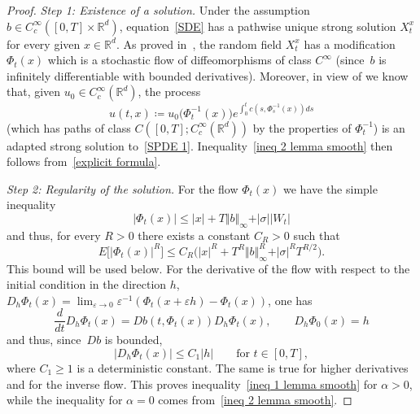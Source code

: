 \documentclass[a4paper,10pt]{article}
\newcommand\1{\mathbbm{1}}
\newcommand{\eps}{\varepsilon}
\numberwithin{equation}{section}
\begin{document}
\begin{proof}
\emph{Step 1: Existence of a solution.} Under the assumption $b\in C_{c}^{\infty}([0,T] \times\mathbb{R}^{d})$, equation~\eqref{SDE} has a pathwise unique strong solution $X_{t}^{x}$ for every given $x\in\mathbb{R}^{d}$. As proved in~\cite{KUNITA84}, the random field $X_{t}^{x}$ has
a modification $\Phi_{t}(x)$ which is a stochastic flow of diffeomorphisms of class $C^{\infty}$ (since~$b$ is infinitely differentiable with bounded derivatives). Moreover, in view of \cite[Theorem~6.1.9]{KUNITA90} we know that, given $u_{0}\in C_{c}^{\infty}(\mathbb{R}^{d})$, the process
\begin{equation}
u(t,x)  \coloneqq u_{0}\big(\Phi_{t}^{-1}(x) \big) e^{\int_{0}^{t}c(s,\Phi_{s}^{-1}(x))
ds}\label{explicit formula}
\end{equation}
(which has paths of class $C([0,T];C^{\infty}_c(\mathbb{R}^{d}))$ by the properties of $\Phi_{t}^{-1}$) is an adapted strong solution to~\eqref{SPDE 1}. Inequality~\eqref{ineq 2 lemma smooth} then follows from~\eqref{explicit formula}.

\emph{Step 2: Regularity of the solution.} For the flow $\Phi_{t}(x)$ we have the simple inequality 
\begin{equation*}
\vert \Phi_{t}(x) \vert \leq \vert x \vert +T \Vert b \Vert_{\infty}+ \vert \sigma \vert \vert
W_{t} \vert
\end{equation*}
and thus, for every $R>0$ there exists a constant $C_{R}>0$ such that
\begin{equation}
E\big[ \vert \Phi_{t}(x) \vert^{R} \big] \leq
C_{R} \big( \vert x \vert^{R}+ T^{R} \Vert b\Vert_{\infty}^{R}+ \vert \sigma \vert^{R} T^{R/2}\big) .
\label{bound on the flow}
\end{equation}
This bound will be used below. For the derivative of the flow with respect to the initial condition in the direction $h$, $D_{h}\Phi_{t}(x) =\lim_{\eps\rightarrow0} \eps^{-1} ( \Phi_{t}(x+\eps h)-\Phi_{t}(x) )$, one has
\begin{equation*}
\frac{d}{dt}D_{h}\Phi_{t}(x)  =Db(t,\Phi_{t}(x))  D_{h}\Phi_{t}(x)  , \qquad D_{h}\Phi_{0}(x)  =h
\end{equation*}
and thus, since~$Db$ is bounded,
\begin{equation}
\vert D_{h}\Phi_{t}(x) \vert \leq C_{1} \vert h \vert \qquad \text{for } t\in [0,T],  \label{ineq smooth uniform} 
\end{equation}
where $C_1 \geq 1$ is a deterministic constant. The same is true for higher derivatives and for the inverse flow. This proves inequality~\eqref{ineq 1 lemma smooth} for $\alpha>0$, while the inequality for $\alpha=0$ comes from~\eqref{ineq 2 lemma smooth}.


\end{proof}
\end{document}
